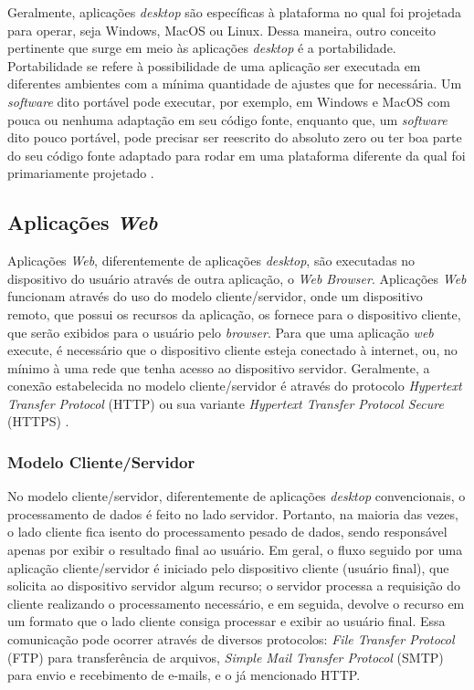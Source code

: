 Geralmente, aplicações \textit{desktop} são específicas à plataforma no qual foi projetada para operar, seja Windows, MacOS ou Linux. Dessa maneira, outro conceito pertinente que surge em meio às aplicações \textit{desktop} é a portabilidade. Portabilidade se refere à possibilidade de uma aplicação ser executada em diferentes ambientes com a mínima quantidade de ajustes que for necessária. Um \textit{software} dito portável pode executar, por exemplo, em Windows e MacOS com pouca ou nenhuma adaptação em seu código fonte, enquanto que, um \textit{software} dito pouco portável, pode precisar ser reescrito do absoluto zero ou ter boa parte do seu código fonte adaptado para rodar em uma plataforma diferente da qual foi primariamente projetado \cite{tanenbaum1978guidelines}.

\subsection{Aplicações \textit{Web}}

Aplicações \textit{Web}, diferentemente de aplicações \textit{desktop}, são executadas no dispositivo do usuário através de outra aplicação, o \textit{Web Browser}. Aplicações \textit{Web} funcionam através do uso do modelo cliente/servidor, onde um dispositivo remoto, que possui os recursos da aplicação, os fornece para o dispositivo cliente, que serão exibidos para o usuário pelo \textit{browser}. Para que uma aplicação \textit{web} execute, é necessário que o dispositivo cliente esteja conectado à internet, ou, no mínimo à uma rede que tenha acesso ao dispositivo servidor. Geralmente, a conexão estabelecida no modelo cliente/servidor é através do protocolo \textit{Hypertext Transfer Protocol} (HTTP) ou sua variante \textit{Hypertext Transfer Protocol Secure} (HTTPS) \cite{conallen1999modeling}.

\subsubsection{Modelo Cliente/Servidor}

No modelo cliente/servidor, diferentemente de aplicações \textit{desktop} convencionais, o processamento de dados é feito no lado servidor. Portanto, na maioria das vezes, o lado cliente fica isento do processamento pesado de dados, sendo responsável apenas por exibir o resultado final ao usuário. Em geral, o fluxo seguido por uma aplicação cliente/servidor é iniciado pelo dispositivo cliente (usuário final), que solicita ao dispositivo servidor algum recurso; o servidor processa a requisição do cliente realizando o processamento necessário, e em seguida, devolve o recurso em um formato que o lado cliente consiga processar e exibir ao usuário final. Essa comunicação pode ocorrer através de diversos protocolos: \textit{File Transfer Protocol} (FTP) para transferência de arquivos, \textit{Simple Mail Transfer Protocol} (SMTP) para envio e recebimento de e-mails, e o já mencionado HTTP.

